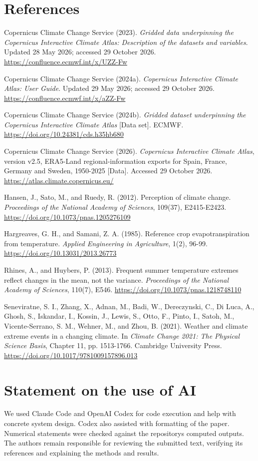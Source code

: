 \documentclass[
  10pt,
]{article}
\begin{document}
\clearpage

\section*{References}\label{references}

Copernicus Climate Change Service (2023). \emph{Gridded data
underpinning the Copernicus Interactive Climate Atlas: Description of
the datasets and variables}. Updated 28 May 2026; accessed 29 October
2026. \url{https://confluence.ecmwf.int/x/UZZ-Fw}

Copernicus Climate Change Service (2024a). \emph{Copernicus Interactive
Climate Atlas: User Guide}. Updated 29 May 2026; accessed 29 October
2026. \url{https://confluence.ecmwf.int/x/aZZ-Fw}

Copernicus Climate Change Service (2024b). \emph{Gridded dataset
underpinning the Copernicus Interactive Climate Atlas} {[}Data set{]}.
ECMWF. \url{https://doi.org/10.24381/cds.h35hb680}

Copernicus Climate Change Service (2026). \emph{Copernicus Interactive
Climate Atlas}, version v2.5, ERA5-Land regional-information exports for
Spain, France, Germany and Sweden, 1950-2025 {[}Data{]}. Accessed 29
October 2026. \url{https://atlas.climate.copernicus.eu/}

Hansen, J., Sato, M., and Ruedy, R. (2012). Perception of climate
change. \emph{Proceedings of the National Academy of Sciences}, 109(37),
E2415-E2423. \url{https://doi.org/10.1073/pnas.1205276109}

Hargreaves, G. H., and Samani, Z. A. (1985). Reference crop
evapotranspiration from temperature. \emph{Applied Engineering in
Agriculture}, 1(2), 96-99. \url{https://doi.org/10.13031/2013.26773}

Rhines, A., and Huybers, P. (2013). Frequent summer temperature extremes
reflect changes in the mean, not the variance. \emph{Proceedings of the
National Academy of Sciences}, 110(7), E546.
\url{https://doi.org/10.1073/pnas.1218748110}

Seneviratne, S. I., Zhang, X., Adnan, M., Badi, W., Dereczynski, C., Di
Luca, A., Ghosh, S., Iskandar, I., Kossin, J., Lewis, S., Otto, F.,
Pinto, I., Satoh, M., Vicente-Serrano, S. M., Wehner, M., and Zhou, B.
(2021). Weather and climate extreme events in a changing climate. In
\emph{Climate Change 2021: The Physical Science Basis}, Chapter 11, pp.
1513-1766. Cambridge University Press.
\url{https://doi.org/10.1017/9781009157896.013}

\section*{Statement on the use of AI}\label{statement-on-the-use-of-ai}

We used Claude Code and OpenAI Codex for code execution and help with
concrete system design. Codex also assisted with formatting of the
paper. Numerical statements were checked against the
repository\textquotesingle s computed outputs. The authors remain
responsible for reviewing the submitted text, verifying its references
and explaining the methods and results.
\end{document}
